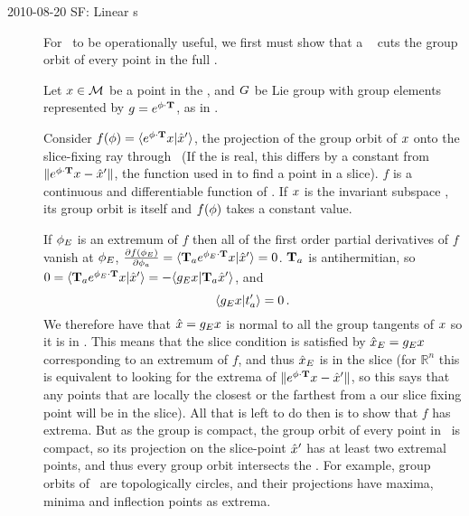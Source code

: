 \begin{description}
\item[2010-08-20 SF: Linear \slice s]
For \mslices\ to be operationally useful, we first must show that a \slice\ 
cuts the group orbit of every point in the full \statesp.

Let $x \in {\cal M}$ be a point in the \statesp, and $G$ be Lie group with group elements represented  by $g=e^{{\bf \phi} \cdot \mathbf{T}}$, as in .

Consider $f(\gSpace)=\braket{e^{\gSpace \cdot \Lg} \ssp}{\slicep}$, the projection of the group orbit of $x$ onto the slice-fixing ray through \slicep\ (If the {\statesp} is real, this differs by a constant from $\|e^{{\bf \phi} \cdot \mathbf{T}}x - {\hat{x}'}\|$, the function used in to find a point in a slice).
$f$ is a continuous and differentiable function of \gSpace. If $x$ is the invariant subspace , its group orbit is itself and $f({\bf \phi})$ takes a constant value.

If ${\bf \phi}_E$ is an extremum of $f$ then all of the first order partial derivatives of $f$ vanish at ${\bf \phi}_E$, $\frac{\partial f(\gSpace_E)}{\partial \gSpace_a} =\braket{\Lg_a e^{\gSpace_E \cdot \Lg} \ssp}{\slicep}=0$. $\mathbf{T}_a$ is antihermitian, so
$0=\braket{\Lg_a e^{\gSpace_E \cdot \Lg}\ssp}{\slicep}
= - \braket{\LieEl_E \ssp}{\Lg_a  \slicep}$,
and
\[
\braket{\LieEl_E \ssp}{\sliceTan{a}} =0
\,.
\]
We therefore have that $\hat{x}= g_E x$ is normal to all the group tangents of $x$ so it is in \pSRed. This means that the slice condition is satisfied by $\hat{x}_E = g_E x$ corresponding to an extremum of $f$, and thus $\hat{x}_E$ is in the slice (for $\mathbb{R}^n$ this is equivalent to looking for the extrema of $\|e^{{\bf \phi} \cdot \mathbf{T}}x - {\hat{x}'}\|$, so this says that any points that are locally the closest or the farthest from a our slice fixing point will be in the slice). All that is left to do then is to show that $f$ has extrema. But as the group is compact, the group orbit of every point in \pS\ is compact, so its projection on the slice-point ${\hat{x}'}$ has at least two extremal points, and thus every group orbit intersects the \slice. For example, group orbits of \ are topologically circles, and their projections have maxima, minima and inflection points as extrema.




\end{description}
